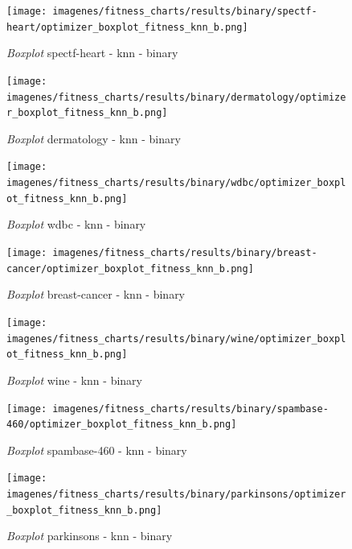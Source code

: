 \begin{figure}[htp]
    \centering
    \texttt{[image: imagenes/fitness\_charts/results/binary/spectf-heart/optimizer\_boxplot\_fitness\_knn\_b.png]}
    \caption{\textit{Boxplot} spectf-heart - knn - binary}

\end{figure}

\begin{figure}[htp]
    \centering
    \texttt{[image: imagenes/fitness\_charts/results/binary/dermatology/optimizer\_boxplot\_fitness\_knn\_b.png]}
    \caption{\textit{Boxplot} dermatology - knn - binary}

\end{figure}

\begin{figure}[htp]
    \centering
    \texttt{[image: imagenes/fitness\_charts/results/binary/wdbc/optimizer\_boxplot\_fitness\_knn\_b.png]}
    \caption{\textit{Boxplot} wdbc - knn - binary}

\end{figure}

\begin{figure}[htp]
    \centering
    \texttt{[image: imagenes/fitness\_charts/results/binary/breast-cancer/optimizer\_boxplot\_fitness\_knn\_b.png]}
    \caption{\textit{Boxplot} breast-cancer - knn - binary}

\end{figure}

\begin{figure}[htp]
    \centering
    \texttt{[image: imagenes/fitness\_charts/results/binary/wine/optimizer\_boxplot\_fitness\_knn\_b.png]}
    \caption{\textit{Boxplot} wine - knn - binary}

\end{figure}

\begin{figure}[htp]
    \centering
    \texttt{[image: imagenes/fitness\_charts/results/binary/spambase-460/optimizer\_boxplot\_fitness\_knn\_b.png]}
    \caption{\textit{Boxplot} spambase-460 - knn - binary}

\end{figure}

\begin{figure}[htp]
    \centering
    \texttt{[image: imagenes/fitness\_charts/results/binary/parkinsons/optimizer\_boxplot\_fitness\_knn\_b.png]}
    \caption{\textit{Boxplot} parkinsons - knn - binary}

\end{figure}

